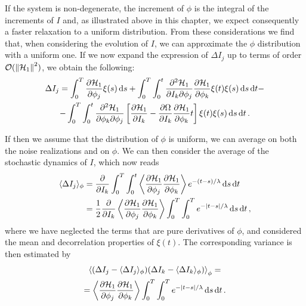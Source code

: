If the system is non-degenerate, %
the increment of $\phi$ is the integral of the increments of $I$ and, as illustrated above in this chapter, we expect consequently a faster relaxation to a uniform distribution. From these considerations we find that, when considering the evolution of $I$, we can approximate the $\phi$ distribution with a uniform one. If we now expand the expression of $\Delta I_j$ up to terms of order \(\mathcal{O}(\norm{\mathcal{H}_1}^2)\), we obtain the following:
\begin{multline}
	\Delta I_j = \int_0^T \pdv{\mathcal{H}_1}{\phi_j}\xi(s)\,\mathrm{d}s + \int_0^T\int_0^t \pdv{\mathcal{H}_1}{I_k}{\phi_j}\pdv{\mathcal{H}_1}{\phi_k}\xi(t)\xi(s)\,\mathrm{d}s\,\mathrm{d}t - \\
	- \int_0^T\int_0^t\pdv{\mathcal{H}_1}{\phi_k}{\phi_j}\left[\pdv{\mathcal{H}_1}{I_k}-\pdv{\Omega}{I_k}\pdv{\mathcal{H}_1}{\phi_k}t\right]\xi(t)\xi(s)\,\mathrm{d}s\,\mathrm{d}t\,.
\end{multline}

If then we assume that the distribution of \(\phi\) is uniform, we can average on both the noise realizations and on $\phi$. We can then consider the average of the stochastic dynamics of \(I\), which now reads
\begin{equation}
	\begin{aligned}
		\langle\Delta I_j\rangle_\phi &= \pdv{}{I_k}\int_0^T\int_0^t \left\langle\pdv{\mathcal{H}_1}{\phi_j}\pdv{\mathcal{H}_1}{\phi_k}\right\rangle e^{-(t-s)/\lambda}\,\mathrm{d}s\,\mathrm{d}t\\
		&= \frac{1}{2}\pdv{}{I_k}\left\langle\pdv{\mathcal{H}_1}{\phi_j}\pdv{\mathcal{H}_1}{\phi_k}\right\rangle\int_0^T\int_0^T e^{-\abs{t-s}/\lambda}\,\mathrm{d}s\,\mathrm{d}t\,,
	\end{aligned}
\end{equation}
where we have neglected the terms that are pure derivatives of $\phi$, and considered the mean and decorrelation properties of \(\xi(t)\). The corresponding variance is then estimated by
\begin{multline}
	\left\langle(\Delta I_j - \langle\Delta I_j\rangle_\phi)(\Delta I_k - \langle\Delta I_k\rangle_\phi)\right\rangle_\phi =\\
	= \left\langle\pdv{\mathcal{H}_1}{\phi_j}\pdv{\mathcal{H}_1}{\phi_k}\right\rangle\int_0^T\int_0^T e^{-\abs{t-s}/\lambda}\,\mathrm{d}s\,\mathrm{d}t\,.
\end{multline}

